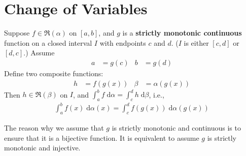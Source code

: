 \documentclass[thmcnt=section, 12pt]{elegantbook}
\begin{document}

\section{Change of Variables}


\begin{theorem}
    Suppose $f \in \mathfrak{R}(\alpha)$ on $[a, b]$, and $g$ is a \textbf{strictly monotonic continuous} function on a closed interval $I$ with endpoints $c$ and $d$. ($I$ is either $[c, d]$ or $[d, c]$.) Assume
    \begin{align*}
        a &= g(c) & b &= g(d)
    \end{align*}
    Define two composite functions:
    \begin{align*}
        h &= f(g(x)) & 
        \beta &= \alpha(g(x))
    \end{align*}
    Then $h \in \mathfrak{R}(\beta)$ on $I$, and $\int_a^b f \; \mathrm{d}\alpha = \int_c^d h \; \mathrm{d}\beta$, i.e., 
    \begin{align*}
        \int_a^b f(x) \; \mathrm{d}\alpha(x) = \int_c^d f(g(x)) \; \mathrm{d}\alpha(g(x))
    \end{align*}
\end{theorem}

\begin{remark}
    The reason why we assume that $g$ is strictly monotonic and continuous is to ensure that it is a bijective function. It is equivalent to assume $g$ is strictly monotonic and injective.
\end{remark}
\end{document}
